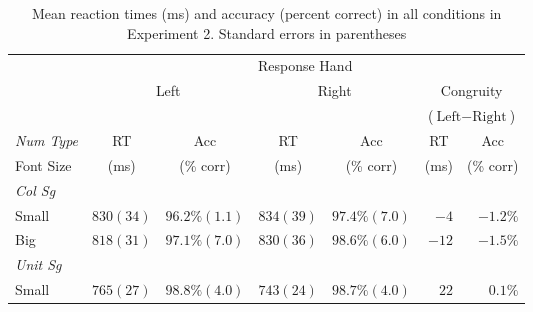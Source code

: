\documentclass[output=paper]{langscibook}
\begin{document}

\begin{table}
\caption{Mean reaction times (ms) and accuracy (percent correct) in all conditions in Experiment 2. Standard errors in parentheses}
\label{gul-bla:tab:all-conditions-exp2}
\begin{tabularx}{.97\textwidth}{X r@{~~~}r r@{~~~}r r@{~~~}r}
\lsptoprule
&\multicolumn{6}{c}{Response Hand}\\\cmidrule(lr){2-7}
&\multicolumn{2}{c}{\multirow{2}{*}{Left}}&\multicolumn{2}{c}{\multirow{2}{*}{Right}}&\multicolumn{2}{c}{Congruity}\\
&&&&&\multicolumn{2}{c}{($\text{Left}-\text{Right}$)}\\\cmidrule(lr){2-3}\cmidrule(lr){4-5}\cmidrule(lr){6-7}
\textit{Num Type}&\multicolumn{1}{c}{RT}&\multicolumn{1}{c}{Acc}&\multicolumn{1}{c}{RT}&\multicolumn{1}{c}{Acc}&\multicolumn{1}{c}{RT}&\multicolumn{1}{c}{Acc}\\
\hspace{6pt}Font Size&\multicolumn{1}{c}{(ms)}&\multicolumn{1}{c}{(\% corr)}&\multicolumn{1}{c}{(ms)}&\multicolumn{1}{c}{(\% corr)}&\multicolumn{1}{c}{(ms)}&\multicolumn{1}{c}{(\% corr)}\\\midrule
\textit{Col Sg}\\
\hspace{6pt}Small& $830 (34)$ & $96.2\% (1.1)$ & $834 (39)$ & $97.4\% (7.0)$ & $-4$  & $-1.2\%$ \\
\hspace{6pt}Big& $818 (31)$ & $97.1\% (7.0)$ & $830 (36)$ & $98.6\% (6.0)$ & $-12$ & $-1.5\%$ \\\tablevspace
\textit{Unit Sg}\\
\hspace{6pt}Small& $765 (27)$ & $98.8\% (4.0)$ & $743 (24)$ & $98.7\% (4.0)$ & $22$  & $0.1\%$  \\

\end{tabularx}
\end{table}
\end{document}
